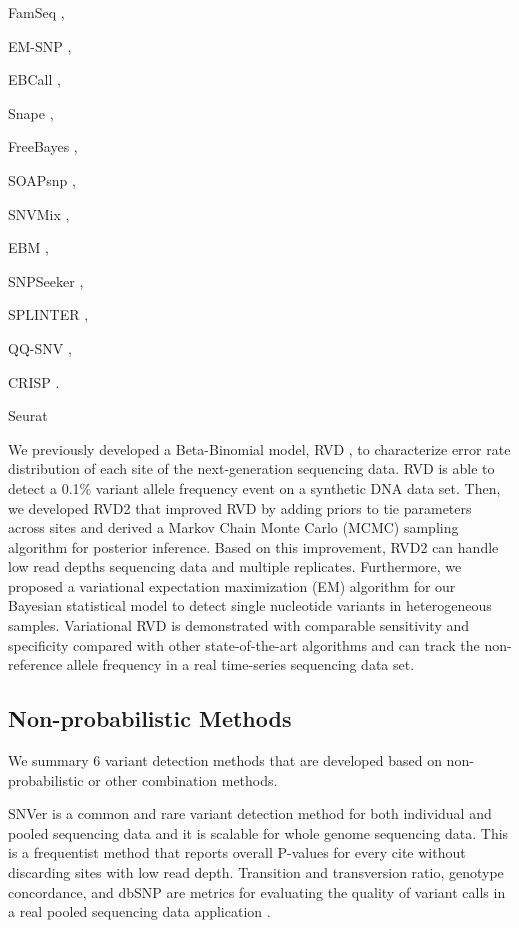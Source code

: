 \documentclass[11pt,reqno]{amsart}
\begin{document}
FamSeq \citep{Peng2013},


EM-SNP \citep{Chen2013},


EBCall \citep{Shiraishi2013},

Snape \citep{Raineri2012},

FreeBayes \citep{Garrison2012},

SOAPsnp \citep{Li2009},

SNVMix \citep{Goya2010},

EBM \citep{Zhou2012},

SNPSeeker \citep{Druley2009},

SPLINTER \citep{Spencer2014},

QQ-SNV \citep{VanderBorght2015},

CRISP \citep{Bansal2010}.

Seurat \citep{Christoforides2013}

We previously developed a Beta-Binomial model, RVD \citep{Flaherty2012}, to characterize error rate distribution of each site of the next-generation sequencing data.
RVD is able to detect a 0.1\% variant allele frequency event on a synthetic DNA data set.
Then, we developed RVD2 \citep{He2015} that improved RVD by adding priors to tie parameters across sites and derived a Markov Chain Monte Carlo (MCMC) sampling algorithm for posterior inference.
Based on this improvement, RVD2 can handle low read depths sequencing data and multiple replicates.
Furthermore, we proposed a variational expectation maximization (EM) algorithm \citep{zhang2016variational} for our Bayesian statistical model to detect single nucleotide variants in heterogeneous samples.
Variational RVD is demonstrated with comparable sensitivity and specificity compared with other state-of-the-art algorithms and can track the non-reference allele frequency in a real time-series sequencing data set.


\subsection{Non-probabilistic Methods}
We summary 6 variant detection methods that are developed based on non-probabilistic or other combination methods.

SNVer \citep{Wei2011} is a common and rare variant detection method for both individual and pooled sequencing data and it is scalable for whole genome sequencing data.
This is a frequentist method that reports overall P-values for every cite without discarding sites with low read depth.
Transition and transversion ratio, genotype concordance, and dbSNP are metrics for evaluating the quality of variant calls in a real pooled sequencing data application \citep{depristo2011framework}.
\end{document}
